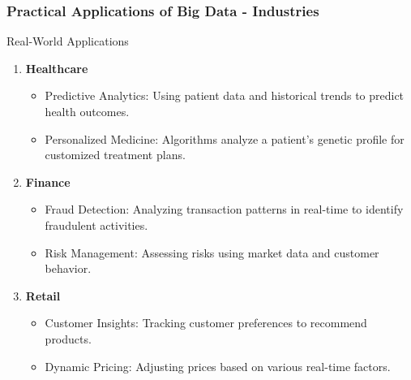 \documentclass[aspectratio=169]{beamer}
\begin{document}
\begin{frame}[fragile]
    \frametitle{Practical Applications of Big Data - Industries}
    \begin{block}{Real-World Applications}
        \begin{enumerate}
            \item \textbf{Healthcare}
            \begin{itemize}
                \item Predictive Analytics: Using patient data and historical trends to predict health outcomes.
                \item Personalized Medicine: Algorithms analyze a patient's genetic profile for customized treatment plans.
            \end{itemize}

            \item \textbf{Finance}
            \begin{itemize}
                \item Fraud Detection: Analyzing transaction patterns in real-time to identify fraudulent activities.
                \item Risk Management: Assessing risks using market data and customer behavior.
            \end{itemize}

            \item \textbf{Retail}
            \begin{itemize}
                \item Customer Insights: Tracking customer preferences to recommend products.
                \item Dynamic Pricing: Adjusting prices based on various real-time factors.
            \end{itemize}
        \end{enumerate}
    \end{block}
\end{frame}
\end{document}
